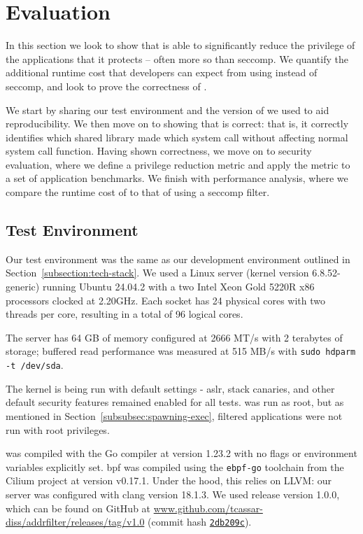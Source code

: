 \section{Evaluation}\label{sec:evaluation}

In this section we look to show that \af is able to significantly reduce the
privilege of the applications that it protects -- often more so than seccomp. 
We quantify the additional runtime cost that developers can expect from using 
\af  instead of seccomp, and look to prove the correctness of \af.

We start by sharing our test environment and the version of \af we used to
aid reproducibility. We then move on to showing that \af is correct: that
is, it correctly identifies which shared library made which system call without
affecting normal system call function. Having shown correctness, we move on to
security evaluation, where we define a privilege reduction metric and apply the
metric to a set of application benchmarks. We finish with performance analysis,
where we compare the runtime cost of \af to that of using a seccomp filter.

\subsection{Test Environment}

Our test environment was the same as our development environment outlined in
Section~\ref{subsection:tech-stack}. We used a Linux server (kernel version
6.8.52-generic) running Ubuntu 24.04.2 with a two Intel Xeon
Gold 5220R x86 processors clocked at 2.20GHz. Each socket has 24 physical 
cores with two threads per core, resulting in a total of 96 logical cores.

The server has 64 GB of memory configured at 2666 MT/s with 2 terabytes
of storage; buffered read performance was measured at 515 MB/s with 
\texttt{sudo hdparm -t /dev/sda}.

The kernel is being run with default settings - \ac{aslr}, stack
canaries, and other default security features remained enabled for all tests.
\af was run as root, but as mentioned in Section~\ref{subsubsec:spawning-exec},
filtered applications were not run with root privileges.

\af was compiled with the Go compiler at version 1.23.2 with no flags or
environment variables explicitly set. \ac{bpf} was
compiled using the \texttt{ebpf-go} toolchain from the Cilium project at version
v0.17.1. Under the hood, this relies on LLVM: our server was configured with
clang version 18.1.3. We used \af release version 1.0.0, which can be found on
GitHub at
\href{https://github.com/tcassar-diss/addrfilter/releases/tag/v1.0}
{www.github.com/tcassar-diss/addrfilter/releases/tag/v1.0}
(commit hash 
\href{https://github.com/tcassar-diss/addrfilter/tree/2bd209c630df3509d4ac721d018dabab94305dde}
{\texttt{2db209c}}).

